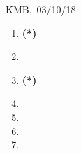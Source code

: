 \documentclass[10pt]{article}
\begin{document}
\begin{flushright} KMB,\ 03/10/18\end{flushright}


\begin{enumerate}
\item{\bf(*)}
\item
\item{\bf(*)}
\item
\item
\item
\item
\end{enumerate}
\end{document}
